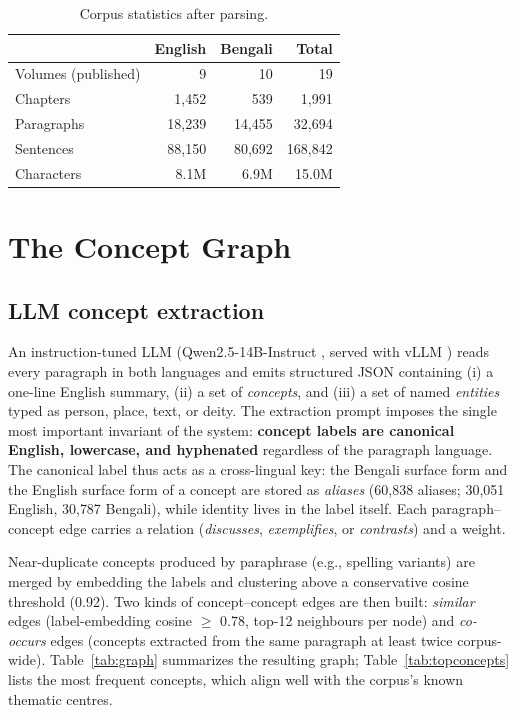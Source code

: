 \documentclass[11pt,a4paper]{article}
\begin{document}
\begin{table}[t]
\centering
\caption{Corpus statistics after parsing.}
\label{tab:corpus}
\begin{tabular}{lrrr}
\toprule
 & English & Bengali & Total\\
\midrule
Volumes (published)  & 9      & 10     & 19\\
Chapters    & 1{,}452 & 539   & 1{,}991\\
Paragraphs  & 18{,}239 & 14{,}455 & 32{,}694\\
Sentences   & 88{,}150 & 80{,}692 & 168{,}842\\
Characters  & 8.1M   & 6.9M   & 15.0M\\
\bottomrule
\end{tabular}
\end{table}

\section{The Concept Graph}
\label{sec:graph}

\subsection{LLM concept extraction}

An instruction-tuned LLM (Qwen2.5-14B-Instruct \cite{qwen25}, served with
vLLM \cite{kwon2023vllm}) reads every paragraph in both languages and
emits structured JSON containing (i) a one-line English summary, (ii) a
set of \emph{concepts}, and (iii) a set of named \emph{entities} typed as
person, place, text, or deity. The extraction prompt imposes the single
most important invariant of the system: \textbf{concept labels are
canonical English, lowercase, and hyphenated} regardless of the paragraph
language. The canonical label thus acts as a cross-lingual key: the
Bengali surface form and the English surface form of a concept are stored
as \emph{aliases} (60{,}838 aliases; 30{,}051 English, 30{,}787 Bengali),
while identity lives in the label itself. Each paragraph--concept edge
carries a relation (\emph{discusses}, \emph{exemplifies}, or
\emph{contrasts}) and a weight.

Near-duplicate concepts produced by paraphrase (e.g., spelling variants)
are merged by embedding the labels and clustering above a conservative
cosine threshold (0.92). Two kinds of concept--concept edges are then
built: \emph{similar} edges (label-embedding cosine $\geq$ 0.78, top-12
neighbours per node) and \emph{co-occurs} edges (concepts extracted from
the same paragraph at least twice corpus-wide).
Table~\ref{tab:graph} summarizes the resulting graph;
Table~\ref{tab:topconcepts} lists the most frequent concepts, which
align well with the corpus's known thematic centres.
\end{document}
